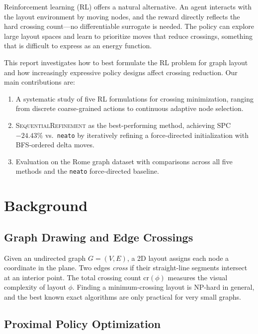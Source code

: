 \documentclass[10pt,twocolumn]{article}
\begin{document}
Reinforcement learning (RL) offers a natural alternative.  An agent interacts
with the layout environment by moving nodes, and the reward directly reflects
the hard crossing count---no differentiable surrogate is needed.  The policy
can explore large layout spaces and learn to prioritize moves that reduce
crossings, something that is difficult to express as an energy function.

This report investigates how to best formulate the RL problem for graph layout
and how increasingly expressive policy designs affect crossing reduction.
Our main contributions are:
\begin{enumerate}[leftmargin=*,topsep=2pt,itemsep=0pt]
    \item A systematic study of five RL formulations for crossing minimization,
          ranging from discrete coarse-grained actions to continuous adaptive
          node selection.
    \item \textsc{SequentialRefinement} as the best-performing method,
          achieving SPC $-24.43\%$ vs.\ \texttt{neato} by iteratively
          refining a force-directed initialization with BFS-ordered delta moves.
    \item Evaluation on the Rome graph dataset with comparisons across all
          five methods and the \texttt{neato} force-directed baseline.
\end{enumerate}

\section{Background}
\label{sec:background}

\subsection{Graph Drawing and Edge Crossings}

Given an undirected graph $G=(V,E)$, a 2D layout assigns each node a
coordinate in the plane.  Two edges \emph{cross} if their straight-line
segments intersect at an interior point.  The total crossing count
$\text{cr}(\phi)$ measures the visual complexity of layout $\phi$.
Finding a minimum-crossing layout is NP-hard in general, and the best known
exact algorithms are only practical for very small graphs.

\subsection{Proximal Policy Optimization}
\end{document}
